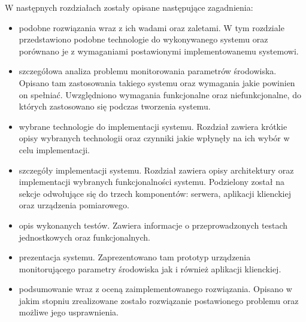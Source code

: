 W następnych rozdziałach zostały opisane następujące zagadnienia:
\begin{itemize}
  \item podobne rozwiązania wraz z ich wadami oraz zaletami. 
    W tym rozdziale przedstawiono podobne technologie do wykonywanego
    systemu oraz porównano je z wymaganiami postawionymi implementowanemu
    systemowi.
  \item szczegółowa analiza problemu monitorowania parametrów środowiska.
    Opisano tam zastosowania takiego systemu oraz wymagania jakie powinien
    on spełniać. Uwzględniono wymagania funkcjonalne oraz niefunkcjonalne, 
    do których zastosowano się podczas tworzenia systemu.
  \item wybrane technologie do implementacji systemu. Rozdział
    zawiera krótkie opisy wybranych technologii oraz czynniki jakie
    wpłynęły na ich wybór w celu implementacji.
  \item szczegóły implementacji systemu. Rozdział zawiera opisy
    architektury oraz implementacji wybranych funkcjonalności
    systemu. Podzielony został na sekcje odwołujące się do trzech
    komponentów: serwera, aplikacji klienckiej oraz urządzenia pomiarowego.
  \item opis wykonanych testów. Zawiera informacje o przeprowadzonych
    testach jednostkowych oraz funkcjonalnych.
  \item prezentacja systemu. Zaprezentowano tam prototyp urządzenia
    monitorującego parametry środowiska jak i również aplikacji klienckiej.
  \item podsumowanie wraz z oceną zaimplementowanego rozwiązania. Opisano
    w jakim stopniu zrealizowane zostało rozwiązanie postawionego problemu
    oraz możliwe jego usprawnienia.
\end{itemize}
